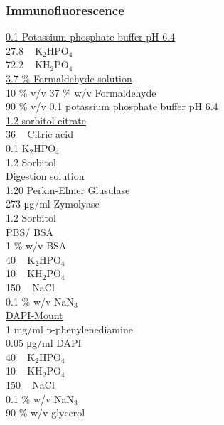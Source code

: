 
\subsubsection{Immunofluorescence}

\underline{0.1 \si{\Molar} Potassium phosphate buffer pH 6.4}\\
27.8 \si{\milli\Molar} K$_{2}$HPO$_{4}$ \\
72.2 \si{\milli\Molar} KH$_{2}$PO$_{4}$ \\

\underline{3.7 \% Formaldehyde solution}\\
10 \% v/v 37 \% w/v Formaldehyde\\
90 \% v/v 0.1 \si{\Molar} potassium phosphate buffer pH 6.4\\

\underline{1.2 \si{\Molar} sorbitol-citrate}\\
36 \si{\milli\Molar} Citric acid\\
0.1 \si{\Molar} K$_{2}$HPO$_{4}$\\
1.2 \si{\Molar} Sorbitol\\

\underline{Digestion solution}\\
1:20 Perkin-Elmer Glusulase \\
273 \si{\micro\gram/\milli\litre} Zymolyase\\
1.2 \si{\Molar} Sorbitol\\

\underline{PBS/ BSA}\\
1 \% w/v BSA\\
40 \si{\milli\Molar} K$_{2}$HPO$_{4}$\\
10 \si{\milli\Molar} KH$_{2}$PO$_{4}$\\
150 \si{\milli\Molar} NaCl\\
0.1 \% w/v NaN$_{3}$\\

\underline{DAPI-Mount}\\
1 \si{\milli\gram/\milli\litre} p-phenylenediamine\\
0.05 \si{\micro\gram/\milli\litre} DAPI\\
40 \si{\milli\Molar} K$_{2}$HPO$_{4}$\\
10 \si{\milli\Molar} KH$_{2}$PO$_{4}$\\
150 \si{\milli\Molar} NaCl\\
0.1 \% w/v NaN$_{3}$\\
90 \% w/v glycerol\\

